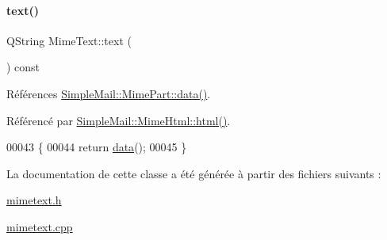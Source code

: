 \paragraph{\texorpdfstring{text()}{text()}}
{\footnotesize\ttfamily Q\+String Mime\+Text\+::text (\begin{DoxyParamCaption}{ }\end{DoxyParamCaption}) const}



Références \hyperlink{class_simple_mail_1_1_mime_part_ab6260fc481df5162673f1ac93ec92dac}{Simple\+Mail\+::\+Mime\+Part\+::data()}.



Référencé par \hyperlink{class_simple_mail_1_1_mime_html_a842b4cadf1faecfbe442cd829aa66cbb}{Simple\+Mail\+::\+Mime\+Html\+::html()}.


\begin{DoxyCode}
00043 \{
00044     \textcolor{keywordflow}{return} \hyperlink{class_simple_mail_1_1_mime_part_ab6260fc481df5162673f1ac93ec92dac}{data}();
00045 \}
\end{DoxyCode}


La documentation de cette classe a été générée à partir des fichiers suivants \+:\begin{DoxyCompactItemize}
\item 
\hyperlink{mimetext_8h}{mimetext.\+h}\item 
\hyperlink{mimetext_8cpp}{mimetext.\+cpp}\end{DoxyCompactItemize}
